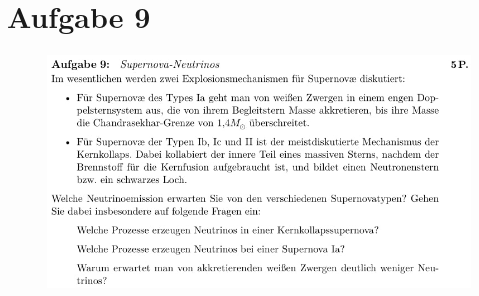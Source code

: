\section{Aufgabe 9}

\begin{figure}[H]
    \centering
    \includegraphics[width=\textwidth]{images/Aufgabe9.jpg}
    \label{fig:4}
\end{figure}



